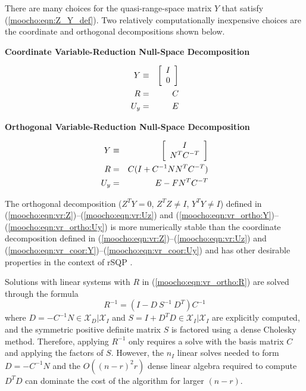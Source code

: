 \documentclass[pdf,ps2pdf,11pt]{SANDreport}
\begin{document}
There are many choices for the quasi-range-space matrix $Y$ that
satisfy (\ref{moocho:eqn:Z_Y_def}).  Two relatively computationally
inexpensive choices are the coordinate and orthogonal decompositions
shown below.

{\bsinglespace
\begin{center}\textbf{Coordinate Variable-Reduction Null-Space Decomposition}\end{center}
\begin{eqnarray}
Y & \equiv & {\bmat{c} I \\ 0 \emat}    \label{moocho:eqn:vr_coor:Y} \\
R & = & C                               \label{moocho:eqn:vr_coor:R} \\
U_y & = & E                             \label{moocho:eqn:vr_coor:Uy}
\end{eqnarray}

\begin{center}\textbf{Orthogonal Variable-Reduction Null-Space Decomposition}\end{center}
\begin{eqnarray}
Y & \equiv & {\bmat{c} I \\ N^T C^{-T} \emat}       \label{moocho:eqn:vr_ortho:Y} \\
R & = & C (I + C^{-1 }N N^T C^{-T})                 \label{moocho:eqn:vr_ortho:R} \\
U_y & = & E - F N^T C^{-T}                          \label{moocho:eqn:vr_ortho:Uy}
\end{eqnarray}
\esinglespace}

The orthogonal decomposition ($Z^T Y = 0$, $Z^T Z \neq I$, $Y^T Y \neq I$)
defined in (\ref{moocho:eqn:vr:Z})--(\ref{moocho:eqn:vr:Uz}) and
(\ref{moocho:eqn:vr_ortho:Y})--(\ref{moocho:eqn:vr_ortho:Uy}) is more
numerically stable than the coordinate decomposition defined in
(\ref{moocho:eqn:vr:Z})--(\ref{moocho:eqn:vr:Uz}) and
(\ref{moocho:eqn:vr_coor:Y})--(\ref{moocho:eqn:vr_coor:Uy}) and has other
desirable properties in the context of rSQP {}\cite{ref:schmid_accel_1993}.

Solutions with linear systems with $R$ in (\ref{moocho:eqn:vr_ortho:R}) are
solved through the formula
%
\begin{equation}
R^{-1} = ( I - D \: S^{-1} \: D^T ) C^{-1}
\label{moocho:eqn:vr_ortho:R:SMW}
\end{equation}
%
where $D = -C^{-1} N {}\in\mathcal{X}_D|\mathcal{X}_I$ and $S = I + D^T D
{}\in\mathcal{X}_I|\mathcal{X}_I$ are explicitly computed, and the symmetric
positive definite matrix $S$ is factored using a dense Cholesky method.
Therefore, applying $R^{-1}$ only requires a solve with the basis matrix $C$
and applying the factors of $S$.  However, the $n_I$ linear solves needed to
form $D = -C^{-1} N$ and the $O((n-r)^2 r)$ dense linear algebra required to
compute $D^T D$ can dominate the cost of the algorithm for larger $(n-r)$.
\end{document}

